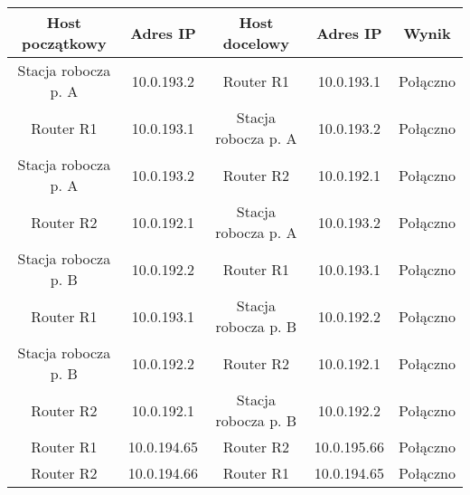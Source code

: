 \documentclass[wide,a4paper,titlepage,12pt] {article}
\begin{document}
  \begin{center}
    \begin{tabular}{|c|c||c|c||c|}
      \hline
      Host początkowy & Adres IP & Host docelowy & Adres IP & Wynik \\
      \hline
      Stacja robocza p. A       & 10.0.193.2    & Router R1             & 10.0.193.1  & Połączno \\
      Router R1                 & 10.0.193.1    & Stacja robocza p. A   & 10.0.193.2  & Połączno \\

      Stacja robocza p. A       & 10.0.193.2    & Router R2             & 10.0.192.1  & Połączno \\
      Router R2                 & 10.0.192.1    & Stacja robocza p. A   & 10.0.193.2  & Połączno \\


      Stacja robocza p. B       & 10.0.192.2    & Router R1             & 10.0.193.1  & Połączno \\
      Router R1                 & 10.0.193.1    & Stacja robocza p. B   & 10.0.192.2  & Połączno \\

      Stacja robocza p. B       & 10.0.192.2    & Router R2             & 10.0.192.1  & Połączno \\
      Router R2                 & 10.0.192.1    & Stacja robocza p. B   & 10.0.192.2  & Połączno \\

      Router R1 & 10.0.194.65   & Router R2   & 10.0.195.66   & Połączno \\
      Router R2 & 10.0.194.66   & Router R1   & 10.0.194.65   & Połączno \\
      \hline
    \end{tabular}
  \end{center}
\end{document}
